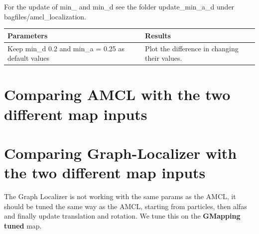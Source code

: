 \documentclass[11pt,a4paper]{article}
\begin{document}
For the update of min{\_} and min{\_}d see the folder update{\_}min{\_}a{\_}d under bagfiles/amcl{\_}localization.

\begin{center}
\begin{tabular}{| m{12em} | m{13em}|} 
\hline
\textbf{Parameters} & \textbf{Results} \\
\hline
Keep min{\_}d 0.2 and min{\_}a = 0.25 as default values & Plot the difference in changing their values. \\
\hline
\end{tabular}
\end{center}


\section{Comparing AMCL with the two different map inputs}



\section{Comparing Graph-Localizer with the two different map inputs}

The Graph Localizer is not working with the same params as the AMCL, it should be tuned the same way as the AMCL, starting from particles, then alfas and finally update translation and rotation. We tune this on the \textbf{GMapping tuned} map. 
\end{document}
